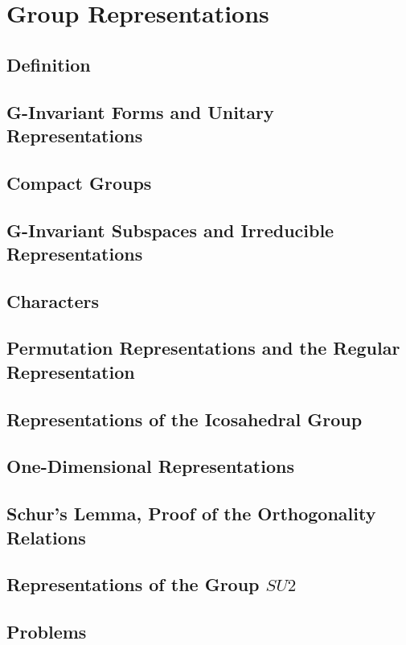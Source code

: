\chapter{Group Representations}
\section{Definition}
\section{G-Invariant Forms and Unitary Representations}
\section{Compact Groups}
\section{G-Invariant Subspaces and Irreducible Representations}
\section{Characters}
\section{Permutation Representations and the Regular Representation}
\section{Representations of the Icosahedral Group}
\section{One-Dimensional Representations}
\section{Schur's Lemma, Proof of the Orthogonality Relations}
\section{Representations of the Group $SU2$}
\section{Problems}
